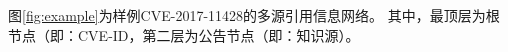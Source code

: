 
\begin{exmp}
图\ref{fig:example}为样例CVE-2017-11428的多源引用信息网络。 其中，最顶层为根节点（即：CVE-ID，第二层为公告节点（即：知识源）。
\end{exmp}

